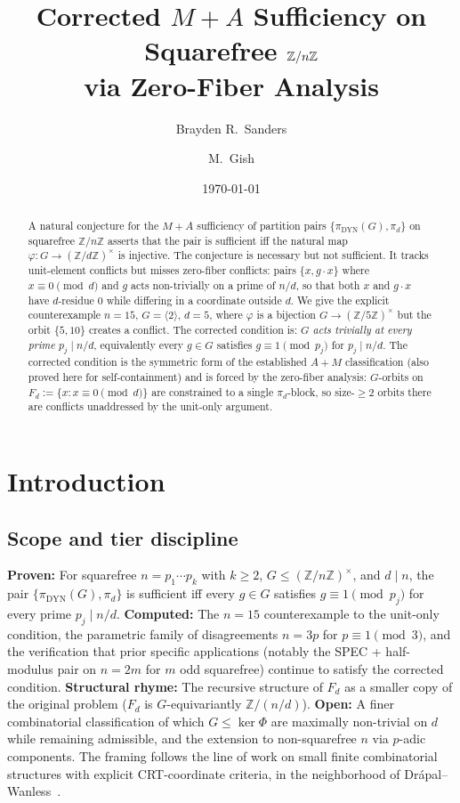 \documentclass[11pt,reqno]{amsart}
\title[Corrected $M{+}A$ Sufficiency on Squarefree $\Z/n\Z$]{Corrected $M{+}A$ Sufficiency on Squarefree $\Z/n\Z$\\via Zero-Fiber Analysis}
\author{Brayden R.\ Sanders}
\author{M.\ Gish}
\date{\today}
\theoremstyle{plain}
\theoremstyle{definition}
\newcommand{\Z}{\mathbb{Z}}
\newcommand{\Zn}{\Z/n\Z}
\newcommand{\Zns}{(\Z/n\Z)^{\times}}
\newcommand{\DYN}{\mathrm{DYN}}
\begin{document}
\begin{abstract}
A natural conjecture for the $M{+}A$ sufficiency of partition pairs $\{\pi_{\DYN}(G), \pi_d\}$ on squarefree $\Zn$ asserts that the pair is sufficient iff the natural map $\varphi \colon G \to (\Z/d\Z)^{\times}$ is injective. The conjecture is necessary but not sufficient. It tracks unit-element conflicts but misses zero-fiber conflicts: pairs $\{x, g \cdot x\}$ where $x \equiv 0 \pmod d$ and $g$ acts non-trivially on a prime of $n/d$, so that both $x$ and $g \cdot x$ have $d$-residue $0$ while differing in a coordinate outside $d$. We give the explicit counterexample $n = 15$, $G = \langle 2 \rangle$, $d = 5$, where $\varphi$ is a bijection $G \to (\Z/5\Z)^{\times}$ but the orbit $\{5, 10\}$ creates a conflict. The corrected condition is: \emph{$G$ acts trivially at every prime $p_j \mid n/d$}, equivalently every $g \in G$ satisfies $g \equiv 1 \pmod{p_j}$ for $p_j \mid n/d$. The corrected condition is the symmetric form of the established $A{+}M$ classification (also proved here for self-containment) and is forced by the zero-fiber analysis: $G$-orbits on $F_d := \{x : x \equiv 0 \pmod d\}$ are constrained to a single $\pi_d$-block, so size-$\geq 2$ orbits there are conflicts unaddressed by the unit-only argument.
\end{abstract}

\maketitle

\section{Introduction}

\subsection{Scope and tier discipline}

\textbf{Proven:} For squarefree $n = p_1 \cdots p_k$ with $k \geq 2$, $G \leq \Zns$, and $d \mid n$, the pair $\{\pi_{\DYN}(G), \pi_d\}$ is sufficient iff every $g \in G$ satisfies $g \equiv 1 \pmod{p_j}$ for every prime $p_j \mid n/d$. \textbf{Computed:} The $n = 15$ counterexample to the unit-only condition, the parametric family of disagreements $n = 3p$ for $p \equiv 1 \pmod 3$, and the verification that prior specific applications (notably the SPEC + half-modulus pair on $n = 2m$ for $m$ odd squarefree) continue to satisfy the corrected condition. \textbf{Structural rhyme:} The recursive structure of $F_d$ as a smaller copy of the original problem ($F_d$ is $G$-equivariantly $\Z/(n/d)$). \textbf{Open:} A finer combinatorial classification of which $G \leq \ker \Phi$ are maximally non-trivial on $d$ while remaining admissible, and the extension to non-squarefree $n$ via $p$-adic components. The framing follows the line of work on small finite combinatorial structures with explicit CRT-coordinate criteria, in the neighborhood of Drápal--Wanless~\cite{DrapalWanless2021}.
\end{document}

